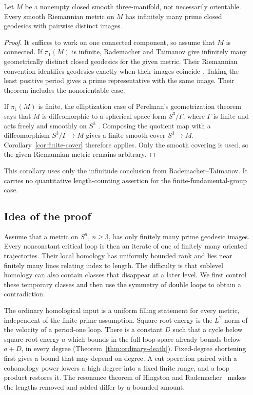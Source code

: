 \begin{corollary}\label{cor:three-manifolds}
Let $M$ be a nonempty closed smooth three-manifold, not necessarily orientable.
Every smooth Riemannian metric on $M$ has infinitely many prime closed
geodesics with pairwise distinct images.
\end{corollary}

\begin{proof}
It suffices to work on one connected component, so assume that $M$ is
connected. If $\pi_1(M)$ is infinite, Rademacher and Taimanov
\cite[Theorem~2]{RademacherTaimanov2018} give infinitely many geometrically
distinct closed geodesics for the given metric. Their Riemannian convention
identifies geodesics exactly when their images coincide
\cite[Section~3]{RademacherTaimanov2018}. Taking the least positive period
gives a prime representative with the same image. Their theorem includes
the nonorientable case.

If $\pi_1(M)$ is finite, the elliptization case of Perelman's geometrization
theorem says that $M$ is diffeomorphic to a spherical space form
$S^3/\Gamma$, where $\Gamma$ is finite and acts freely and smoothly on $S^3$
\cite[Corollary~0.2(b)]{MorganTian2007}. Composing the quotient map with a
diffeomorphism $S^3/\Gamma\to M$ gives a finite smooth cover $S^3\to M$.
Corollary~\ref{cor:finite-cover} therefore applies. Only the smooth covering
is used, so the given Riemannian metric remains arbitrary.
\end{proof}

This corollary uses only the infinitude conclusion from Rademacher--Taimanov.
It carries no quantitative length-counting assertion for the
finite-fundamental-group case.

\subsection{Idea of the proof}

Assume that a metric on $S^n$, $n\ge3$, has only finitely many prime geodesic
images. Every nonconstant critical loop is then an iterate of one of finitely many
oriented trajectories. Their local homology has uniformly bounded rank and
lies near finitely many lines relating index to length. The difficulty is
that sublevel homology can also contain classes that disappear at a later
level. We first control these temporary classes and then use the symmetry
of double loops to obtain a contradiction.

The ordinary homological input is a uniform filling statement for every
metric, independent of the finite-prime assumption. Square-root energy
is the $L^2$-norm of the velocity of a period-one loop.
There is a constant $D$ such that a cycle below square-root energy $a$
which bounds in the full loop space already bounds below $a+D$,
in every degree (Theorem~\ref{thm:ordinary-death}). Fixed-degree shortening
first gives a bound that may depend on degree. A cut operation paired with
a cohomology power lowers a high degree into a fixed finite range, and a
loop product restores it. The resonance theorem of Hingston and
Rademacher~\cite{HingstonRademacher2013} makes the lengths removed and added
differ by a bounded amount.

